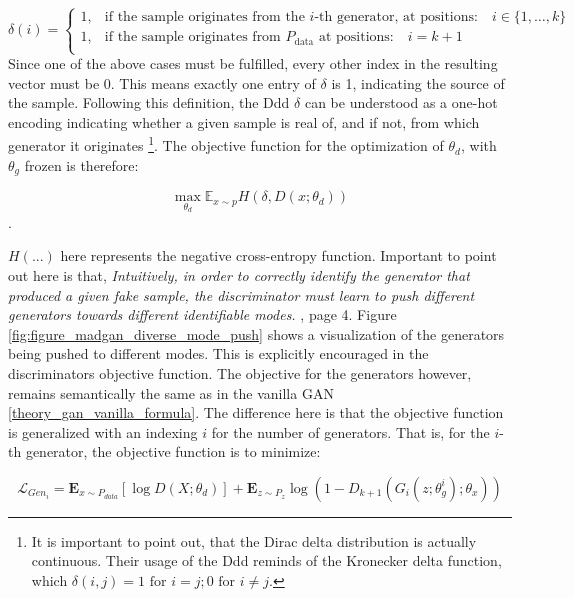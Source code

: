 \[
\delta(i) = 
\begin{cases}
1, & \text{if the sample originates from the } i\text{-th generator, at positions:} \quad i \in \{1, \ldots, k\} \\
1, & \text{if the sample originates from } P_{\text{data}} \text{ at positions:} \quad i = k+1 \\
\end{cases}
\]
Since one of the above cases must be fulfilled, every other index in the resulting vector must be $0$. This means exactly one entry of \(\delta\) is 1, indicating the source of the sample.
Following this definition, the Ddd \(\delta\) can be understood as a one-hot encoding indicating whether a given sample is real of, and if not, from which generator it originates \footnote{It is important to point out, that the Dirac delta distribution is actually continuous. Their usage of the Ddd reminds of the Kronecker delta function, which \( \delta(i,j) = 1 \text{ for } i=j; 0 \text{ for } i \ne j \).}. The objective function for the optimization of \(\theta_d\), with \(\theta_g\) frozen is therefore:

\begin{equation}
    \max\limits_{\theta_d}\mathbb{E}_{x \sim p} H(\delta, D(x; \theta_d))
\end{equation}.

\noindent
\(H(...)\) here represents the negative cross-entropy function. Important to point out here is that, \textit{Intuitively, in order to correctly identify the generator that produced a given fake sample, the discriminator must learn to push different generators towards different identifiable modes.} \cite{ghosh2018madgan}, page 4. Figure \ref{fig:figure_madgan_diverse_mode_push} shows a visualization of the generators being pushed to different modes. This is explicitly encouraged in the discriminators objective function. The objective for the generators however, remains semantically the same as in the vanilla GAN \ref{theory_gan_vanilla_formula}. The difference here is that the objective function is generalized with an indexing \(i\) for the number of generators. That is, for the \(i\)-th generator, the objective function is to minimize:

\begin{equation}
    \mathcal{L}_{Gen_i} = \mathbf{E}_{x \sim P_{data}} [ \log D(X; \theta_d) ] + \mathbf{E}_{z \sim P_{z}} \log (1-D_{k+1}(G_i(z; \theta_{g}^{i}); \theta_x))
\end{equation}


